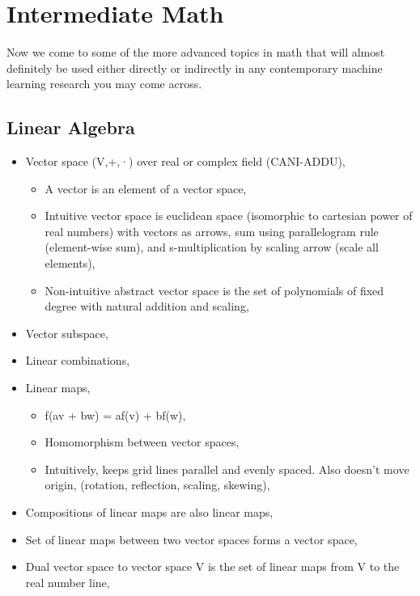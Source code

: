 \hypertarget{intermediate-math}{%
\section{Intermediate Math}\label{intermediate-math}}

Now we come to some of the more advanced topics in math that will almost
definitely be used either directly or indirectly in any contemporary
machine learning research you may come across.

\hypertarget{linear-algebra}{%
\subsection{Linear Algebra}\label{linear-algebra}}

\begin{itemize}
\tightlist
\item
  Vector space (V,+,·) over real or complex field (CANI-ADDU),

  \begin{itemize}
  \tightlist
  \item
    A vector is an element of a vector space,
  \item
    Intuitive vector space is euclidean space (isomorphic to cartesian
    power of real numbers) with vectors as arrows, sum using
    parallelogram rule (element-wise sum), and s-multiplication by
    scaling arrow (scale all elements),
  \item
    Non-intuitive abstract vector space is the set of polynomials of
    fixed degree with natural addition and scaling,
  \end{itemize}
\item
  Vector subspace,
\item
  Linear combinations,
\item
  Linear maps,

  \begin{itemize}
  \tightlist
  \item
    f(av + bw) = af(v) + bf(w),
  \item
    Homomorphism between vector spaces,
  \item
    Intuitively, keeps grid lines parallel and evenly spaced. Also
    doesn't move origin, (rotation, reflection, scaling, skewing),
  \end{itemize}
\item
  Compositions of linear maps are also linear maps,
\item
  Set of linear maps between two vector spaces forms a vector space,
\item
  Dual vector space to vector space V is the set of linear maps from V
  to the real number line,


\end{itemize}
